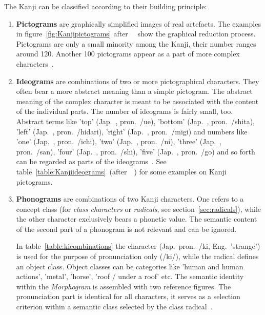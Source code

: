 The Kanji can be classified according to their building principle:
\begin{enumerate}
 \item \textbf{Pictograms} are graphically simplified images of real artefacts.
       The examples in figure~\ref{fig:Kanjipictograms} 
       after~~\citeyear{Kano1990} show the graphical 
       reduction process. Pictograms are only a small minority among the Kanji,
       their number ranges around 120. Another 100 pictograms appear as a part of
       more complex characters~.
       
 \item \textbf{Ideograms} are combinations of two or more pictographical
       characters. They often bear a more abstract meaning than a simple 
       pictogram. The abstract meaning of the complex character is meant to be 
       associated with the content of the individual parts. The number of 
       ideograms is fairly small, too. Abstract terms like 
       'top' (Jap.~, pron.~/ue), 
       'bottom' (Jap.~, pron.~/shita),
       'left' (Jap.~, pron.~/hidari),
       'right' (Jap.~, pron.~/migi)
       and numbers like
       'one' (Jap.~, pron.~/ichi),
       'two' (Jap.~, pron.~/ni),
       'three' (Jap.~, pron.~/san),
       'four' (Jap.~, pron.~/shi),
       'five' (Jap.~, pron.~/go)
       and so forth can be regarded as parts of the 
       ideograms~.
       See table~\ref{table:Kanjiideograms}\ (after~~\citeyear{Kano1990}) for 
       some examples on Kanji pictograms.

 \item \textbf{Phonograms} are combinations of two Kanji characters. One
       refers to a concept class (for \emph{class characters} or \emph{radicals},
       see section~\ref{sec:radicals}), 
       while the other character exclusively bears a phonetic value. The 
       semantic content of the second part of a phonogram is not relevant 
       and can be ignored.

       In table~\ref{table:kicombinations} the character 
        (Jap.~pron.~/ki, Eng.~'strange') is used for the purpose
       of pronunciation only (/ki/), while the radical defines an
       object class. Object classes can be categories like 'human and human 
       actions', 'metal', 'horse', 'roof / under a roof' etc.
       The semantic identity within the \emph{Morphogram} is assembled with two
       reference figures. The pronunciation part is identical for all characters,
       it serves as a selection criterion within a semantic class selected by 
       the class radical~.

\end{enumerate}

